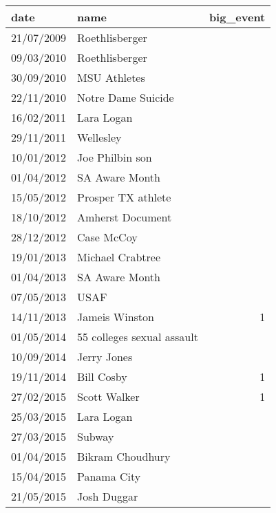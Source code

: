 {
\def\sym#1{\ifmmode^{#1}\else\(^{#1}\)\fi}
\begin{tabular}{llr}
\hline\hline
date       & name                                  & big\_event \\
\hline
21/07/2009 & Roethlisberger                        &            \\
09/03/2010 & Roethlisberger                  &            \\
30/09/2010 & MSU Athletes                          &            \\
22/11/2010 & Notre Dame Suicide  &            \\
16/02/2011 & Lara Logan   &            \\
29/11/2011 & Wellesley    &            \\
10/01/2012 & Joe Philbin son                       &            \\
01/04/2012 & SA Aware Month                        &            \\
15/05/2012 & Prosper TX athlete                    &            \\
18/10/2012 & Amherst Document                      &            \\
28/12/2012 & Case McCoy                            &            \\
19/01/2013 & Michael Crabtree                      &            \\
01/04/2013 & SA Aware Month                        &            \\
07/05/2013 & USAF                          &            \\
14/11/2013 & Jameis Winston                        & 1          \\
01/05/2014 & 55 colleges sexual assault            &            \\
10/09/2014 & Jerry Jones            &            \\
19/11/2014 & Bill Cosby                            & 1          \\
27/02/2015 & Scott Walker                          & 1          \\
25/03/2015 & Lara Logan           &            \\
27/03/2015 & Subway            &            \\
01/04/2015 & Bikram Choudhury                 &            \\
15/04/2015 & Panama City                      &            \\
21/05/2015 & Josh Duggar                           &            \\

\end{tabular}}

